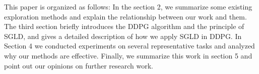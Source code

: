 This paper is organized as follows: In the section 2, we summarize some existing exploration methods and explain the relationship between our work and them. The third section briefly introduces the DDPG algorithm and the principle of SGLD, and gives a detailed description of how we apply SGLD in DDPG. In Section 4 we conducted experiments on several representative tasks and analyzed why our methods are effective. Finally, we summarize this work in section 5 and point out our opinions on further research work.
